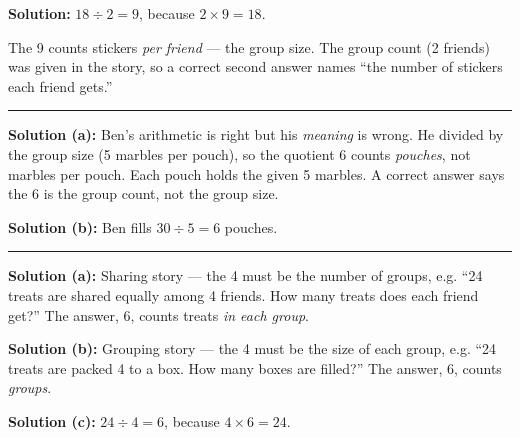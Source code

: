 \documentclass[12pt]{article}
\begin{document}
\textbf{Solution:} $18 \div 2 = 9$, because $2 \times 9 = 18$. 

The 9 counts stickers \emph{per friend} --- the group size. The group count (2 friends) was given in the story, so a correct second answer names ``the number of stickers each friend gets.''

\noindent\rule{\linewidth}{0.2pt}


\textbf{Solution (a):} Ben's arithmetic is right but his \emph{meaning} is wrong. He divided by the group size (5 marbles per pouch), so the quotient 6 counts \emph{pouches}, not marbles per pouch. Each pouch holds the given 5 marbles. A correct answer says the 6 is the group count, not the group size.

\textbf{Solution (b):} Ben fills $30 \div 5 = 6$ pouches. 

\noindent\rule{\linewidth}{0.2pt}


\textbf{Solution (a):} Sharing story --- the 4 must be the number of groups, e.g. ``24 treats are shared equally among 4 friends. How many treats does each friend get?'' The answer, 6, counts treats \emph{in each group}.

\textbf{Solution (b):} Grouping story --- the 4 must be the size of each group, e.g. ``24 treats are packed 4 to a box. How many boxes are filled?'' The answer, 6, counts \emph{groups}.

\textbf{Solution (c):} $24 \div 4 = 6$, because $4 \times 6 = 24$. 
\end{document}
